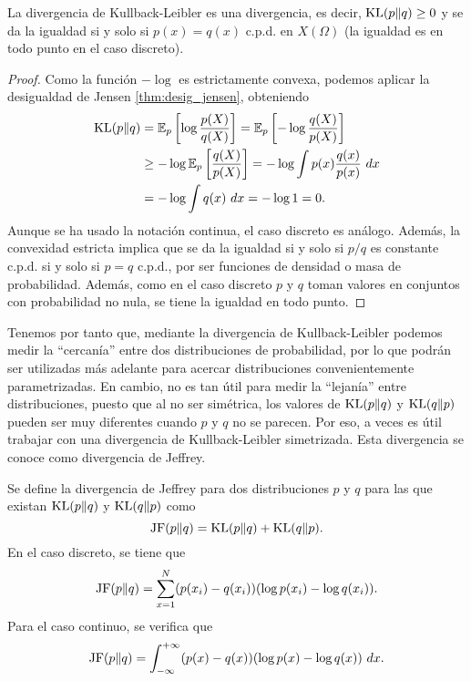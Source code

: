 \begin{thm} \label{thm:desig_infor}
    La divergencia de Kullback-Leibler es una divergencia, es decir, $\operatorname{KL}(p \| q) \ge 0$ y se da la igualdad si y solo si $p(x) = q(x)$ c.p.d. en $X(\Omega)$ (la igualdad es en todo punto en el caso discreto).
\end{thm}

\begin{proof}
    Como la función $-\log$ es estrictamente convexa, podemos aplicar la desigualdad de Jensen \ref{thm:desig_jensen}, obteniendo
    \begin{align*}
        \operatorname{KL}(p \| q) &= \mathbb{E}_p\left[\log\frac{p(X)}{q(X)}\right] 
                    = \mathbb{E}_p\left[-\log\frac{q(X)}{p(X)}\right] \\
                    &\ge -\log\mathbb{E}_p\left[\frac{q(X)}{p(X)}\right] 
                    = -\log\int p(x) \frac{q(x)}{p(x)} \ dx \\
                    &= -\log\int q(x) \ dx = -\log 1 = 0.
    \end{align*}
    Aunque se ha usado la notación continua, el caso discreto es análogo. Además, la convexidad estricta implica que se da la igualdad si y solo si $p/q$ es constante c.p.d. si y solo si $p = q$ c.p.d., por ser funciones de densidad o masa de probabilidad. Además, como en el caso discreto $p$ y $q$ toman valores en conjuntos con probabilidad no nula, se tiene la igualdad en todo punto.
\end{proof}

Tenemos por tanto que, mediante la divergencia de Kullback-Leibler podemos medir la ``cercanía'' entre dos distribuciones de probabilidad, por lo que podrán ser utilizadas más adelante para acercar distribuciones convenientemente parametrizadas. En cambio, no es tan útil para medir la ``lejanía'' entre distribuciones, puesto que al no ser simétrica, los valores de $\operatorname{KL}(p \| q)$ y $\operatorname{KL}(q \| p)$ pueden ser muy diferentes cuando $p$ y $q$ no se parecen. Por eso, a veces es útil trabajar con una divergencia de Kullback-Leibler simetrizada. Esta divergencia se conoce como divergencia de Jeffrey.

\begin{definition}
    Se define la divergencia de Jeffrey para dos distribuciones $p$ y $q$ para las que existan $\operatorname{KL}(p \| q)$ y $\operatorname{KL}(q \| p)$ como
    \[ \operatorname{JF}(p\|q) = \operatorname{KL}(p \| q) + \operatorname{KL}(q \| p). \]
    En el caso discreto, se tiene que
    \[ \operatorname{JF}(p\| q) = \sum_{x =1}^N (p(x_i)-q(x_i))(\log p(x_i) - \log q(x_i)).\]
    Para el caso continuo, se verifica que
    \[ \operatorname{JF}(p\|q) = \int_{-\infty}^{+\infty} (p(x) - q(x))(\log p(x) - \log q(x)) \ dx. \]
\end{definition}

